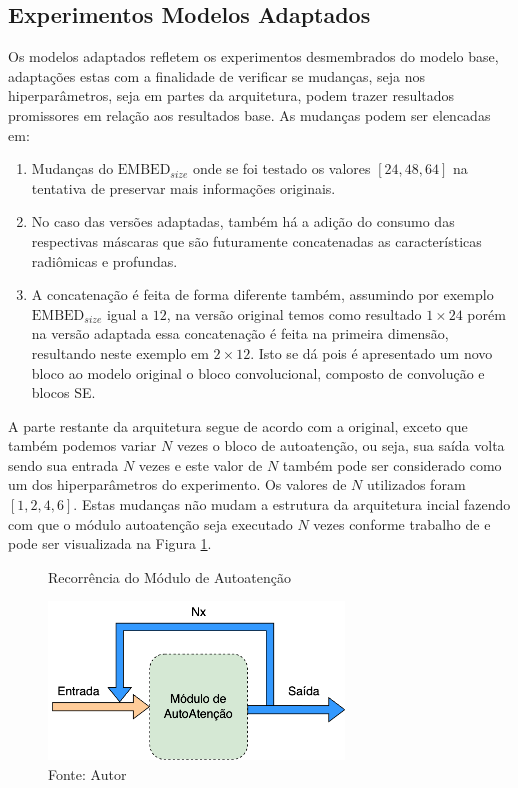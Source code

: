 \subsection{Experimentos Modelos Adaptados}
\label{subsec:cap5_experimentos_adaptados}

Os modelos adaptados refletem os experimentos desmembrados do modelo base, adaptações estas com a finalidade de verificar se mudanças, seja nos hiperparâmetros, seja em partes da arquitetura, podem trazer resultados promissores em relação aos resultados base. As mudanças podem ser elencadas em: 

\begin{enumerate}

\item Mudanças do $\text{EMBED}_{size}$ onde se foi testado os valores $[24, 48, 64]$ na tentativa de preservar mais informações originais.

\item No caso das versões adaptadas, também há a adição do consumo das respectivas máscaras que são futuramente concatenadas as características radiômicas e profundas.

\item A concatenação é feita de forma diferente também, assumindo por exemplo $\text{EMBED}_{size}$ igual a $12$, na versão original temos como resultado $1\times24$ porém na versão adaptada essa concatenação é feita na primeira dimensão, resultando neste exemplo em $2\times12$. Isto se dá pois é apresentado um novo bloco ao modelo original o bloco convolucional, composto de convolução e blocos \gls{SE}.

\end{enumerate}


A parte restante da arquitetura segue de acordo com a original, exceto que também podemos variar $N$ vezes o bloco de autoatenção, ou seja, sua saída volta sendo sua entrada $N$ vezes e este valor de $N$ também pode ser considerado como um dos hiperparâmetros do experimento. Os valores de $N$ utilizados foram $[1, 2, 4, 6]$. Estas mudanças não mudam a estrutura da arquitetura incial fazendo com que o módulo autoatenção seja executado $N$ vezes conforme trabalho de \cite{vaswaniAttentionAllYou2023} e pode ser visualizada na Figura \ref{fig:fig030}.
\newline

\begin{figure}[h!]
    \centering
    \caption{Recorrência do Módulo de Autoatenção}
    \includegraphics[width=0.7\textwidth]{figures/fig030.png}
    \caption*{Fonte: Autor}
    \label{fig:fig030}
\end{figure}




